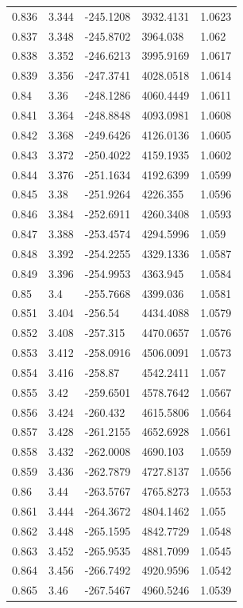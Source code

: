 \begin{tabular}{lllll}
0.836 & 3.344 & -245.1208 & 3932.4131 & 1.0623 \\
0.837 & 3.348 & -245.8702 & 3964.038 & 1.062 \\
0.838 & 3.352 & -246.6213 & 3995.9169 & 1.0617 \\
0.839 & 3.356 & -247.3741 & 4028.0518 & 1.0614 \\
0.84 & 3.36 & -248.1286 & 4060.4449 & 1.0611 \\
0.841 & 3.364 & -248.8848 & 4093.0981 & 1.0608 \\
0.842 & 3.368 & -249.6426 & 4126.0136 & 1.0605 \\
0.843 & 3.372 & -250.4022 & 4159.1935 & 1.0602 \\
0.844 & 3.376 & -251.1634 & 4192.6399 & 1.0599 \\
0.845 & 3.38 & -251.9264 & 4226.355 & 1.0596 \\
0.846 & 3.384 & -252.6911 & 4260.3408 & 1.0593 \\
0.847 & 3.388 & -253.4574 & 4294.5996 & 1.059 \\
0.848 & 3.392 & -254.2255 & 4329.1336 & 1.0587 \\
0.849 & 3.396 & -254.9953 & 4363.945 & 1.0584 \\
0.85 & 3.4 & -255.7668 & 4399.036 & 1.0581 \\
0.851 & 3.404 & -256.54 & 4434.4088 & 1.0579 \\
0.852 & 3.408 & -257.315 & 4470.0657 & 1.0576 \\
0.853 & 3.412 & -258.0916 & 4506.0091 & 1.0573 \\
0.854 & 3.416 & -258.87 & 4542.2411 & 1.057 \\
0.855 & 3.42 & -259.6501 & 4578.7642 & 1.0567 \\
0.856 & 3.424 & -260.432 & 4615.5806 & 1.0564 \\
0.857 & 3.428 & -261.2155 & 4652.6928 & 1.0561 \\
0.858 & 3.432 & -262.0008 & 4690.103 & 1.0559 \\
0.859 & 3.436 & -262.7879 & 4727.8137 & 1.0556 \\
0.86 & 3.44 & -263.5767 & 4765.8273 & 1.0553 \\
0.861 & 3.444 & -264.3672 & 4804.1462 & 1.055 \\
0.862 & 3.448 & -265.1595 & 4842.7729 & 1.0548 \\
0.863 & 3.452 & -265.9535 & 4881.7099 & 1.0545 \\
0.864 & 3.456 & -266.7492 & 4920.9596 & 1.0542 \\
0.865 & 3.46 & -267.5467 & 4960.5246 & 1.0539 \\

\end{tabular}
